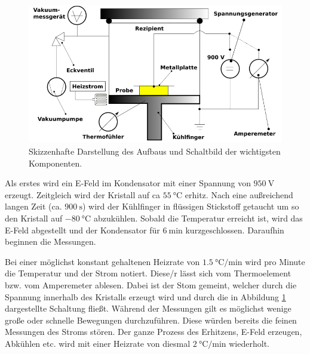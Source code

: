 \begin{figure}
    \centering
    \includegraphics[width=\textwidth]{Bilder/Zeichnung.PNG}
    \caption{Skizzenhafte Darstellung des Aufbaus und Schaltbild der wichtigsten Komponenten.}
    \label{fig:skizze}
\end{figure}


Als erstes wird ein E-Feld im Kondensator mit einer Spannung von $\SI{950}{\volt}$ erzeugt. Zeitgleich wird der Kristall auf ca $\SI{55}{\celsius}$ erhitz. Nach eine außreichend langen Zeit (ca. $\SI{900}{\second}$) wird der Kühlfinger in flüssigen Stickstoff getaucht um so den Kristall auf $\SI{-80}{\celsius}$ abzukühlen. Sobald die Temperatur erreicht ist, wird das E-Feld abgestellt und der Kondensator für $\SI{6}{\minute}$ kurzgeschlossen. Daraufhin beginnen die Messungen.


Bei einer möglichst konstant gehaltenen Heizrate von $\SI{1.5}{\celsius\per\minute}$ wird pro Minute die Temperatur und der Strom notiert. Diese/r lässt sich vom Thermoelement bzw. vom Amperemeter ablesen. Dabei ist der Stom gemeint, welcher durch die Spannung innerhalb des Kristalls erzeugt wird und durch die in Abbildung \ref{fig:skizze} dargestellte Schaltung fließt. Während der Messungen gilt es möglichst wenige große oder schnelle Bewegungen durchzuführen. Diese würden bereits die feinen Messungen des Stroms stören. 
Der ganze Prozess des Erhitzens, E-Feld erzeugen, Abkühlen etc. wird mit einer Heizrate von diesmal $\SI{2}{\celsius\per\minute}$ wiederholt.

